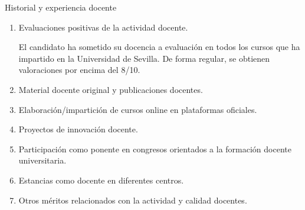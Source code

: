 \documentclass{resume2} %
\begin{document}
\begin{rSection}{Historial y experiencia docente}
\begin{enumerate}[label=\alph*.]
\begin{itemize}
\item  Din\'amica de la dispersi\'on
deuter\'on-n\'ucleo\\ 
{\sc Alumno:} Laura Bur\'on Malag\'on\\
{\sc Tutores:} Mario G\'omez Ramos y Antonio Mat\'ias Moro Mu\~noz\\
{\sc Curso:} 2024-2025\\
{\sc Titulaci\'on:} Doble Grado en F\'isica e Ingenier\'ia de Materiales, Universidad de Sevilla

\end{itemize}

{\bf Trabajos Fin de M\'aster}

\begin{itemize}
\item  Estudio del sistema prot\'on-neutr\'on y del
Berilio 11 en una base gaussiana compleja\\ 
{\sc Alumno:} Daniel Arjona Ni\~no\\
{\sc Tutores:} Jes\'us Casal Berbel, Mario G\'omez Ramos y Antonio Mat\'ias Moro Mu\~noz\\
{\sc Curso:} 2023-2024\\
{\sc Titulaci\'on:} M\'aster Universitario en F\'isica Nuclear por la UAM,UCM,UB,UGR,USAL y la
US

\end{itemize}

\item Evaluaciones positivas de la actividad docente.

El candidato ha sometido su docencia a evaluación en todos los cursos que ha impartido en la Universidad de Sevilla. De forma regular, se obtienen valoraciones por encima
del 8/10.

\item Material docente original y publicaciones docentes.

\item Elaboraci\'on/impartici\'on de cursos online en plataformas oficiales.

\item Proyectos de innovaci\'on docente.

\item Participaci\'on como ponente en congresos orientados a la formaci\'on docente universitaria.

\item Estancias como docente en diferentes centros.

\item Otros m\'eritos relacionados con la actividad y calidad docentes.

\end{enumerate}
\end{rSection}
\end{document}

